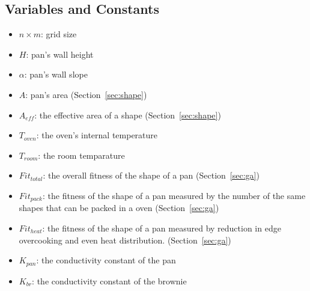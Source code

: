 \documentclass[12pt]{reedmcm}
\begin{document}
\subsection{Variables and Constants}
\begin{itemize}
  \item $n\times m$: grid size
  \item $H$: pan's wall height
  \item $\alpha$: pan's wall slope
  \item $A$: pan's area (Section~\ref{sec:shape})
  \item $A_{eff}$: the effective area of a shape (Section~\ref{sec:shape})
  \item $T_{oven}$: the oven's internal temperature
  \item $T_{room}$: the room temparature
  \item $Fit_{total}$: the overall fitness of the shape of a pan (Section~\ref{sec:ga})
  \item $Fit_{pack}$: the fitness of the shape of a pan measured by the number of the same shapes that can be packed in a oven (Section~\ref{sec:ga})
  \item $Fit_{heat}$: the fitness of the shape of a pan measured by reduction in edge overcooking and even heat distribution. (Section~\ref{sec:ga})
  \item $K_{pan}$: the conductivity constant of the pan
  \item $K_{br}$: the conductivity constant of the brownie
\end{itemize}
\end{document}

